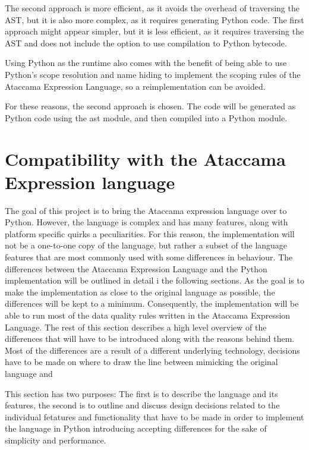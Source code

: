 The second approach is more efficient, as it avoids the overhead of traversing the AST, but it is also more complex, as it requires generating Python code. The first approach might appear simpler, but it is less efficient, as it requires traversing the AST and does not include the option to use compilation to Python bytecode.

Using Python as the runtime also comes with the benefit of being able to use Python's scope resolution and name hiding to implement the scoping rules of the Ataccama Expression Language, so a reimplementation can be avoided.

For these reasons, the second approach is chosen. The code will be generated as Python code using the ast module, and then compiled into a Python module.

\section{Compatibility with the Ataccama Expression language}


The goal of this project is to bring the Ataccama expression language over to
Python. However, the language is complex and has many features, along with
platform specific quirks a peculiarities. For this reason, the implementation will
not be a one-to-one copy of the language, but rather a subset of the language
features that are most commonly used with some differences in behaviour.
The differences between the Ataccama Expression Language and the Python
implementation will be outlined in detail i the following sections. As the goal
is to make the implementation as close to the original language as possible, the
differences will be kept to a minimum. Consequently, the implementation will be
able to run most of the data quality rules written in the Ataccama Expression
Language.
The rest of this section describes a high level overview of the differences that
will have to be introduced along with the reasons behind them. Most of the
differences are a result of a different underlying technology, decisions have to be
made on where to draw the line between mimicking the original language and

This section has two purposes: The first is to describe the language and its features, the second is to outline and discuss design decisions related to the individual fetatures and functionality that have to be made in order to implement the language in Python 
introducing accepting differences for the sake of simplicity and performance.

